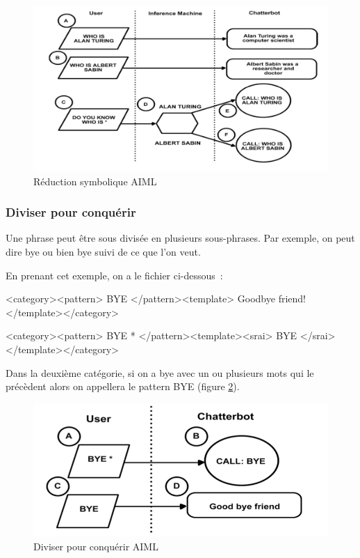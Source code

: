 	\begin{figure}[H]
	\centering
		\includegraphics[width = \textwidth]{aiml1.png}
	\caption{Réduction symbolique AIML}
	\label{fig:Réduction symbolique AIML}
\end{figure}

\subsubsection{Diviser pour conquérir}


Une phrase peut être sous divisée en plusieurs sous-phrases. Par exemple, on peut dire bye ou bien bye suivi de ce que l’on veut.
\vspace{1em}

En prenant cet exemple, on a le fichier ci-dessous :
\vspace{1em}

<category><pattern> BYE </pattern><template> Goodbye friend! </template></category>
\vspace{0.1em}

<category><pattern> BYE * </pattern><template><srai> BYE </srai></template></category>
\vspace{1em}

	Dans la deuxième catégorie, si on a bye avec un ou plusieurs mots qui le précèdent alors on appellera le pattern BYE (figure \ref{fig:Diviser pour conquérir AIML}).
\vspace{1em}

\begin{figure}[H]
	\centering
		\includegraphics[width = \textwidth]{aiml2.png}
	\caption{Diviser pour conquérir AIML}
	\label{fig:Diviser pour conquérir AIML}
\end{figure}

